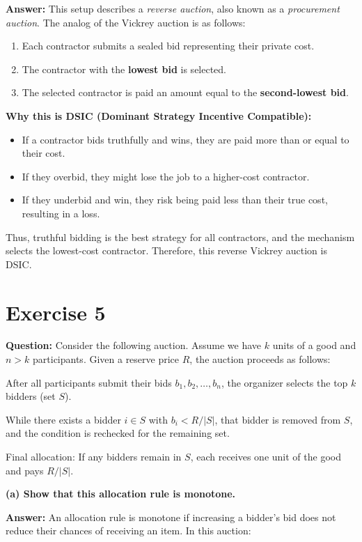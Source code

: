 \documentclass[12pt]{article}
\begin{document}
\textbf{Answer:} This setup describes a \textit{reverse auction}, also known as a \textit{procurement auction}. The analog of the Vickrey auction is as follows:

\begin{enumerate}[label=\arabic*.]
  \item Each contractor submits a sealed bid representing their private cost.
  \item The contractor with the \textbf{lowest bid} is selected.
  \item The selected contractor is paid an amount equal to the \textbf{second-lowest bid}.
\end{enumerate}

\textbf{Why this is DSIC (Dominant Strategy Incentive Compatible):}
\begin{itemize}
  \item If a contractor bids truthfully and wins, they are paid more than or equal to their cost.
  \item If they overbid, they might lose the job to a higher-cost contractor.
  \item If they underbid and win, they risk being paid less than their true cost, resulting in a loss.
\end{itemize}

Thus, truthful bidding is the best strategy for all contractors, and the mechanism selects the lowest-cost contractor. Therefore, this reverse Vickrey auction is DSIC.

\section*{Exercise 5}

\textbf{Question:} Consider the following auction. Assume we have $k$ units of a good and $n > k$ participants. Given a reserve price $R$, the auction proceeds as follows:

After all participants submit their bids $b_1, b_2, \dots, b_n$, the organizer selects the top $k$ bidders (set $S$).

While there exists a bidder $i \in S$ with $b_i < R/|S|$, that bidder is removed from $S$, and the condition is rechecked for the remaining set.

Final allocation: If any bidders remain in $S$, each receives one unit of the good and pays $R/|S|$.

\textbf{(a) Show that this allocation rule is monotone.}

\textbf{Answer:} An allocation rule is monotone if increasing a bidder's bid does not reduce their chances of receiving an item. In this auction:
\end{document}
